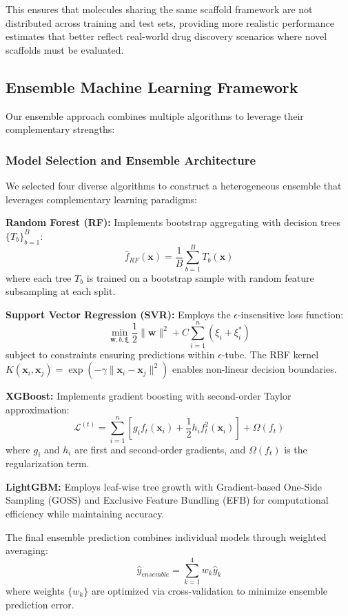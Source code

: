 \documentclass[preprint, 10pt]{elsarticle}
\begin{document}
This ensures that molecules sharing the same scaffold framework are not distributed across training and test sets, providing more realistic performance estimates that better reflect real-world drug discovery scenarios where novel scaffolds must be evaluated.

\subsection{Ensemble Machine Learning Framework}

Our ensemble approach combines multiple algorithms to leverage their complementary strengths:

\subsubsection{Model Selection and Ensemble Architecture}
We selected four diverse algorithms to construct a heterogeneous ensemble that leverages complementary learning paradigms:

\textbf{Random Forest (RF):} Implements bootstrap aggregating with decision trees $\{T_b\}_{b=1}^B$:
$$\hat{f}_{RF}(\mathbf{x}) = \frac{1}{B} \sum_{b=1}^B T_b(\mathbf{x})$$
where each tree $T_b$ is trained on a bootstrap sample with random feature subsampling at each split.

\textbf{Support Vector Regression (SVR):} Employs the $\epsilon$-insensitive loss function:
$$\min_{\mathbf{w},b,\boldsymbol{\xi}} \frac{1}{2}\|\mathbf{w}\|^2 + C\sum_{i=1}^n (\xi_i + \xi_i^*)$$
subject to constraints ensuring predictions within $\epsilon$-tube. The RBF kernel $K(\mathbf{x}_i, \mathbf{x}_j) = \exp(-\gamma \|\mathbf{x}_i - \mathbf{x}_j\|^2)$ enables non-linear decision boundaries.

\textbf{XGBoost:} Implements gradient boosting with second-order Taylor approximation:
$$\mathcal{L}^{(t)} = \sum_{i=1}^n [g_i f_t(\mathbf{x}_i) + \frac{1}{2} h_i f_t^2(\mathbf{x}_i)] + \Omega(f_t)$$
where $g_i$ and $h_i$ are first and second-order gradients, and $\Omega(f_t)$ is the regularization term.

\textbf{LightGBM:} Employs leaf-wise tree growth with Gradient-based One-Side Sampling (GOSS) and Exclusive Feature Bundling (EFB) for computational efficiency while maintaining accuracy.

The final ensemble prediction combines individual models through weighted averaging:
$$\hat{y}_{ensemble} = \sum_{k=1}^4 w_k \hat{y}_k$$
where weights $\{w_k\}$ are optimized via cross-validation to minimize ensemble prediction error.
\end{document}
